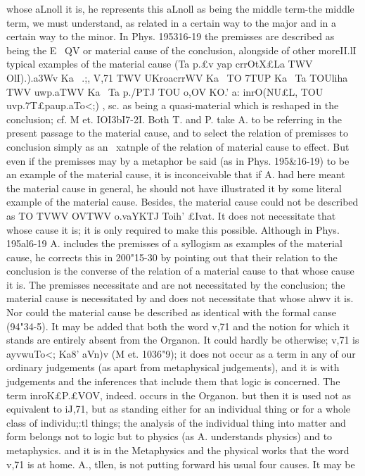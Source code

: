 {{{{{{{{{{{{{{{{{{{{{{{{{{{{{{{{{{{{{{{{{{{{{{{{{{{{{{{{{{whose aLnoll it is, he represents this aLnoll as being the middle
term-the middle term, we must understand, as related in a
certain way to the major and in a certain way to the minor.
In Phys. 195316-19 the premisses are described as being the
E~ QV or material cause of the conclusion, alongside of other moreII.lI
typical examples of the material cause (Ta p.£v yap crrOtX£La TWV
OlI).).a{3Wv Ka~ .;, V},71 TWV UKroacrrWV Ka~ TO 7TUP Ka~ Ta TOUliha TWV
uwp.aTWV Ka~ Ta p./PTJ TOU o},OV KO.' a: inrO(NU£L, TOU uvp.7T£paup.aTo<;) ,
sc. as being a quasi-material which is reshaped in the conclusion;
cf. M et. IOI3bI7-2I. Both T. and P. take A. to be referring in the
present passage to the material cause, and to select the relation
of premisses to conclusion simply as an ~xatnple of the relation
of material cause to effect. But even if the premisses may by
a metaphor be said (as in Phys. 195&16-19) to be an example of
the material cause, it is inconceivable that if A. had here meant
the material cause in general, he should not have illustrated it
by some literal example of the material cause. Besides, the
material cause could not be described as TO T{VWV OVTWV o.vaYKTJ
Toih' £Ivat. It does not necessitate that whose cause it is; it is
only required to make this possible. Although in Phys. 195al6-19
A. includes the premisses of a syllogism as examples of the material
cause, he corrects this in 200"15-30 by pointing out that their
relation to the conclusion is the converse of the relation of a
material cause to that whose cause it is. The premisses necessitate
and are not necessitated by the conclusion; the material cause is
necessitated by and does not necessitate that whose ahwv it is.
Nor could the material cause be described as identical with the
formal canse (94"34-5). It may be added that both the word
v},71 and the notion for which it stands are entirely absent from
the Organon. It could hardly be otherwise; v},71 is ayvwuTo<; Ka8'
aVn)v (M et. 1036"9); it does not occur as a term in any of our
ordinary judgements (as apart from metaphysical judgements),
and it is with judgements and the inferences that include them
that logic is concerned. The term inroK£{P.£VOV, indeed. occurs in
the Organon. but then it is used not as equivalent to iJ},71, but as
standing either for an individual thing or for a whole class of
individu;:tl things; the analysis of the individual thing into matter
and form belongs not to logic but to physics (as A. understands
physics) and to metaphysics. and it is in the Metaphysics and the
physical works that the word v},71 is at home.
A., tllen, is not putting forward his usual four causes. It may be
}}}}}}}}}}}}}}}}}}}}}}}}}}}}}}}}}}}}}}}}}}}}}}}}}}}}}}}

